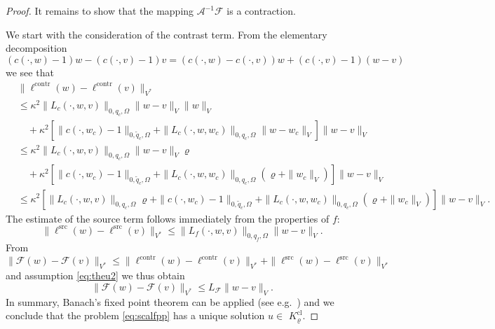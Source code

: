 \documentclass[12pt,DIV=14]{scrartcl}
\providecommand{\Om}{\Omega}
\begin{document}
\begin{proof}
It remains to show that the mapping $\mathcal{A}^{-1}\mathcal{F}$ is a contraction.

We start with the consideration of the contrast term. From the elementary
decomposition
\[
(c(\cdot,w) - 1) w - (c(\cdot,v) - 1) v
=(c(\cdot,w) - c(\cdot,v)) w + (c(\cdot,v)-1) (w - v)
\]
we see that
\begin{align*}
&\|\ell^\mathrm{contr}(w) - \ell^\mathrm{contr}(v)\|_{V^\ast}\\
&\le \kappa^2\|L_c(\cdot,w,v)\|_{0,q_c,\Om}\|w-v\|_V\|w\|_V\\
&\quad + \kappa^2\left[\|c(\cdot,w_c)-1\|_{0,\tilde{q}_c,\Om}
+ \|L_c(\cdot,w,w_c)\|_{0,q_c,\Om}\|w-w_c\|_V\right]\|w-v\|_V\\
&\le \kappa^2\|L_c(\cdot,w,v)\|_{0,q_c,\Om}\|w-v\|_V\varrho\\
&\quad + \kappa^2\left[\|c(\cdot,w_c)-1\|_{0,\tilde{q}_c,\Om}
+ \|L_c(\cdot,w,w_c)\|_{0,q_c,\Om}(\varrho + \|w_c\|_V)\right]\|w-v\|_V\\
&\le \kappa^2\left[\|L_c(\cdot,w,v)\|_{0,q_c,\Om}\varrho
+ \|c(\cdot,w_c)-1\|_{0,\tilde{q}_c,\Om}
+ \|L_c(\cdot,w,w_c)\|_{0,q_c,\Om}(\varrho + \|w_c\|_V)\right]\|w-v\|_V.
\end{align*}
The estimate of the source term follows immediately from the properties of $f$:
\[
\|\ell^\mathrm{src}(w) - \ell^\mathrm{src}(v)\|_{V^\ast}
\le \|L_f(\cdot,w,v)\|_{0,q_f,\Om}\|w-v\|_V.
\]
From
\[
\|\mathcal{F}(w) - \mathcal{F}(v)\|_{V^\ast}
\le \|\ell^\mathrm{contr}(w) - \ell^\mathrm{contr}(v)\|_{V^\ast}
+ \|\ell^\mathrm{src}(w) - \ell^\mathrm{src}(v)\|_{V^\ast}
\]
and assumption \eqref{eq:theu2} we thus obtain
\[
\|\mathcal{F}(w) - \mathcal{F}(v)\|_{V^\ast}
\le L_\mathcal{F} \|w-v\|_V.
\]
In summary, Banach's fixed point theorem can be applied (see e.g.\ \cite[Sect.~9.2.1]{Evans:15})
and we conclude that the problem \eqref{eq:scalfpp}
has a unique solution $u\in$ $K_\varrho^\mathrm{cl}$.
\end{proof}
\end{document}
